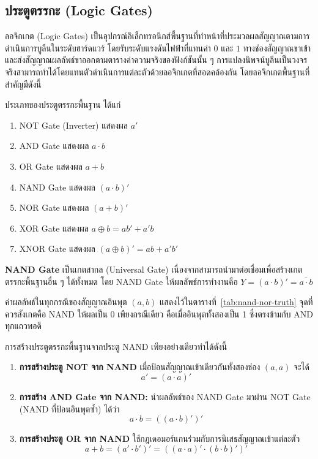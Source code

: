 \subsection{ประตูตรรกะ (Logic Gates)}
ลอจิกเกต (Logic Gates) เป็นอุปกรณ์อิเล็กทรอนิกส์พื้นฐานที่ทำหน้าที่ประมวลผลสัญญาณตามการดำเนินการบูลีนในระดับฮาร์ดแวร์ โดยรับระดับแรงดันไฟฟ้าที่แทนค่า $0$ และ $1$ ทางช่องสัญญาณขาเข้า และส่งสัญญาณผลลัพธ์ขาออกตามตารางค่าความจริงของฟังก์ชันนั้น ๆ การแปลงนิพจน์บูลีนเป็นวงจรจริงสามารถทำได้โดยแทนตัวดำเนินการแต่ละตัวด้วยลอจิกเกตที่สอดคล้องกัน โดยลอจิกเกตพื้นฐานที่สำคัญมีดังนี้~\parencite{wakerly2018digital}


\begin{definition}
ประเภทของประตูตรรกะพื้นฐาน ได้แก่
\begin{enumerate}
    \item NOT Gate (Inverter) แสดงผล $a'$
    \item AND Gate แสดงผล $a \cdot b$
    \item OR Gate แสดงผล $a + b$
    \item NAND Gate แสดงผล $(a \cdot b)'$
    \item NOR Gate แสดงผล $(a + b)'$
    \item XOR Gate แสดงผล $a \oplus b = a b' + a' b$
    \item XNOR Gate แสดงผล $(a \oplus b)' = a b + a' b'$
\end{enumerate}
\end{definition}

\begin{principle}
\textbf{NAND Gate} เป็นเกตสากล (Universal Gate) เนื่องจากสามารถนำมาต่อเชื่อมเพื่อสร้างเกตตรรกะพื้นฐานอื่น ๆ ได้ทั้งหมด โดย NAND Gate ให้ผลลัพธ์การทำงานคือ $Y = (a \cdot b)' = \overline{a \cdot b}$

ค่าผลลัพธ์ในทุกกรณีของสัญญาณอินพุต $(a, b)$ แสดงไว้ในตารางที่~\ref{tab:nand-nor-truth} จุดที่ควรสังเกตคือ NAND ให้ผลเป็น 0 เพียงกรณีเดียว คือเมื่ออินพุตทั้งสองเป็น 1 ซึ่งตรงข้ามกับ AND ทุกแถวพอดี

การสร้างประตูตรรกะพื้นฐานจากประตู NAND เพียงอย่างเดียวทำได้ดังนี้
\begin{enumerate}[label=\textbf{\arabic*.},leftmargin=1.5em,itemsep=0.4em]
    \item \textbf{การสร้างประตู NOT จาก NAND} เมื่อป้อนสัญญาณเข้าเดียวกันทั้งสองช่อง $(a, a)$ จะได้
    \[ a' = (a \cdot a)' \]
    \item \textbf{การสร้าง AND Gate จาก NAND:} นำผลลัพธ์ของ NAND Gate มาผ่าน NOT Gate (NAND ที่ป้อนอินพุตซ้ำ) ได้ว่า
    \[ a \cdot b = ((a \cdot b)')' \]
    \item \textbf{การสร้างประตู OR จาก NAND} ใช้กฎเดอมอร์แกนร่วมกับการนิเสธสัญญาณเข้าแต่ละตัว
    \[ a + b = (a' \cdot b')' = ((a \cdot a)' \cdot (b \cdot b)')' \]
\end{enumerate}
\end{principle}

